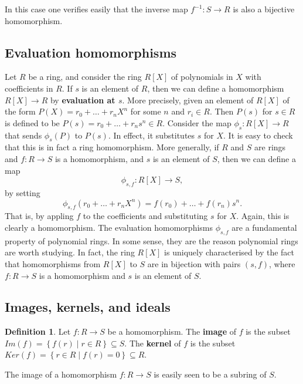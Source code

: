 \documentclass{article}
\newcommand{\rb}[1]{\left( #1 \right)}
\renewcommand{\sb}[1]{\left[ #1 \right]}
\newcommand{\cb}[1]{\left\{ #1 \right\}}
\theoremstyle{definition}\newtheorem{definition}{Definition}[section]
\theoremstyle{definition}\newtheorem{remark}[definition]{Remark}
\theoremstyle{definition}\newtheorem*{example}{Example}
\theoremstyle{definition}\newtheorem*{note}{Note}
\begin{document}
In this case one verifies easily that the inverse map $ f^{-1} : S \to R $ is also a bijective homomorphism.

\subsection{Evaluation homomorphisms}

Let $ R $ be a ring, and consider the ring $ R\sb{X} $ of polynomials in $ X $ with coefficients in $ R $. If $ s $ is an element of $ R $, then we can define a homomorphism $ R\sb{X} \to R $ by \textbf{evaluation at $ s $}. More precisely, given an element of $ R\sb{X} $ of the form $ P\rb{X} = r_0 + \dots + r_nX^n $ for some $ n $ and $ r_i \in R $. Then $ P\rb{s} $ for $ s \in R $ is defined to be $ P\rb{s} = r_0 + \dots + r_ns^n \in R $. Consider the map $ \phi_s : R\sb{X} \to R $ that sends $ \phi_s\rb{P} $ to $ P\rb{s} $. In effect, it substitutes $ s $ for $ X $. It is easy to check that this is in fact a ring homomorphism. More generally, if $ R $ and $ S $ are rings and $ f : R \to S $ is a homomorphism, and $ s $ is an element of $ S $, then we can define a map
$$ \phi_{s, f} : R\sb{X} \to S, $$
by setting
$$ \phi_{s, f}\rb{r_0 + \dots + r_nX^n} = f\rb{r_0} + \dots + f\rb{r_n}s^n. $$
That is, by appling $ f $ to the coefficients and substituting $ s $ for $ X $. Again, this is clearly a homomorphism. The evaluation homomorphisms $ \phi_{s, f} $ are a fundamental property of polynomial rings. In some sense, they are the reason polynomial rings are worth studying. In fact, the ring $ R\sb{X} $ is uniquely characterised by the fact that homomorphisms from $ R\sb{X} $ to $ S $ are in bijection with pairs $ \rb{s, f} $, where $ f : R \to S $ is a homomorphism and $ s $ is an element of $ S $.

\subsection{Images, kernels, and ideals}

\begin{definition}
Let $ f : R \to S $ be a homomorphism. The \textbf{image} of $ f $ is the subset $ Im\rb{f} = \cb{f\rb{r} \mid r \in R} \subseteq S $. The \textbf{kernel} of $ f $ is the subset $ Ker\rb{f} = \cb{r \in R \mid f\rb{r} = 0} \subseteq R $.
\end{definition}

The image of a homomorphism $ f : R \to S $ is easily seen to be a subring of $ S $.
\end{document}
